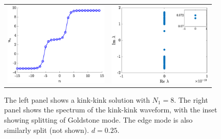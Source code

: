 \documentclass[12pt,reqno]{amsart}
\begin{document}
\begin{figure}
	\begin{center}
	\begin{tabular}{cc}
	\includegraphics[width=5cm]{kk50.eps} &
	\includegraphics[width=5cm]{kk50spec.eps}
	\end{tabular}
	\end{center}
	\caption{The left panel shows a kink-kink solution with $N_1 = 8$. The right panel shows the spectrum of the kink-kink waveform, with the inset showing splitting of Goldstone mode. The edge mode is also similarly 
	split (not shown). $d = 0.25$. }
	\label{fig:kk50}
\end{figure}
\end{document}
